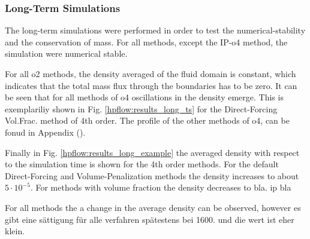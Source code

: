

\subsubsection{Long-Term Simulations}

The long-term simulations were performed in order to test the numerical-stability and the conservation of mass.
For all methods, except the IP-o4 method, the simulation were numerical stable.

For all o2 methods, the density averaged of the fluid domain is constant, which indicates that the total mass flux through the
boundaries has to be zero.
It can be seen that for all methods of o4 oscillations in the density emerge.
This is exemplariliy shown in Fig.  \ref{hpflow:results_long_ts} for the Direct-Forcing Vol.Frac. method of 4th order.
The profile of the other methods of o4, can be fonud in Appendix ().

Finally in Fig. \ref{hpflow:results_long_example} the averaged density with respect to the simulation time is shown for the
4th order methods.
For the default Direct-Forcing and Volume-Penalization methods the density increases to about $5\cdot10^{-5}$.
For methods with volume fraction the density decreases to bla.
ip bla

For all methods the a change in the average density can be observed, however
es gibt eine sättigung für alle verfahren spätestens bei 1600.
und die  wert ist eher klein.

